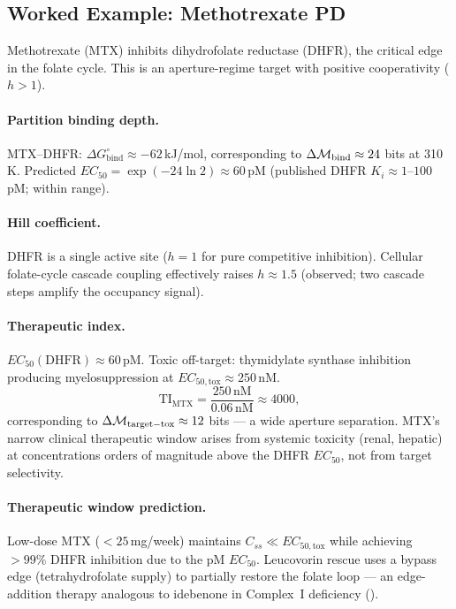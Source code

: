 \subsection{Worked Example: Methotrexate PD}
\label{subsec:ch09-mtx-pd}

Methotrexate (MTX) inhibits dihydrofolate reductase (DHFR), the critical
edge in the folate cycle.  This is an aperture-regime target with positive
cooperativity ($h > 1$).

\paragraph{Partition binding depth.}
MTX--DHFR: $\Delta G^\circ_{\mathrm{bind}} \approx -62$\,kJ/mol,
corresponding to $\Delta\mathcal{M}_{\mathrm{bind}} \approx 24$ bits at 310\,K.
Predicted $EC_{50} = \exp(-24\ln 2) \approx 60$\,pM
(published DHFR $K_i \approx 1$--$100$\,pM; within range).

\paragraph{Hill coefficient.}
DHFR is a single active site ($h = 1$ for pure competitive inhibition).
Cellular folate-cycle cascade coupling effectively raises $h \approx 1.5$
(observed; two cascade steps amplify the occupancy signal).

\paragraph{Therapeutic index.}
$EC_{50}(\mathrm{DHFR}) \approx 60$\,pM.  Toxic off-target:
thymidylate synthase inhibition producing myelosuppression at
$EC_{50,\mathrm{tox}} \approx 250$\,nM.
\begin{equation}
  \mathrm{TI}_{\mathrm{MTX}} = \frac{250\,\mathrm{nM}}{0.06\,\mathrm{nM}}
      \approx 4000,
  \label{eq:ch09-mtx-TI}
\end{equation}
corresponding to $\Delta\mathcal{M}_{\mathrm{target-tox}} \approx 12$ bits ---
a wide aperture separation.  MTX's narrow clinical therapeutic window arises
from systemic toxicity (renal, hepatic) at concentrations orders of magnitude
above the DHFR $EC_{50}$, not from target selectivity.

\paragraph{Therapeutic window prediction.}
Low-dose MTX ($<25$\,mg/week) maintains $C_{ss} \ll EC_{50,\mathrm{tox}}$
while achieving $>99\%$ DHFR inhibition due to the pM $EC_{50}$.  Leucovorin
rescue uses a bypass edge (tetrahydrofolate supply) to partially restore the
folate loop --- an edge-addition therapy analogous to idebenone in Complex~I
deficiency ().

